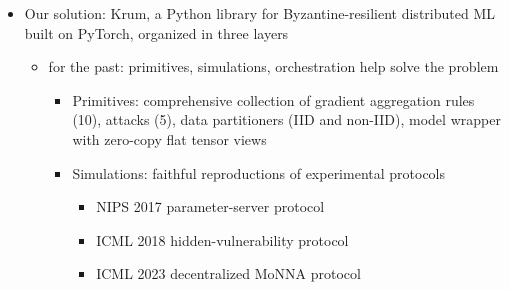 \documentclass[twoside,11pt]{article}
\begin{document}
{\begin{itemize}
\begin{itemize}
        \begin{itemize}
            \item Each paper makes distinct implementation choices
            \item These choices are rarely isolated in reusable components
        \end{itemize}
        \item Existing libraries address parts of the problem, but each has its own scope and design philosophy
        \begin{itemize}
            \item Some offer a collection of aggregation rules without attacks or simulation harnesses
            \item Others focus on a single protocol
            \item None, to our knowledge, provides a unified framework spanning aggregation rules, attacks, experimental protocols, and parameter-sweep orchestration
        \end{itemize}
        \item Support past and (most importantly) future research experiments
        \item Integrated to pytorch 
    \end{itemize}
    \item Our solution: Krum, a Python library for Byzantine-resilient distributed ML built on PyTorch, organized in three layers
    \begin{itemize}
        \item for the past: primitives, simulations, orchestration help solve the problem
        \begin{itemize}
            \item Primitives: comprehensive collection of gradient aggregation rules (10), attacks (5), data partitioners (IID and non-IID), model wrapper with zero-copy flat tensor views
            \item Simulations: faithful reproductions of experimental protocols
            \begin{itemize}
                \item NIPS 2017 parameter-server protocol
                \item ICML 2018 hidden-vulnerability protocol
                \item ICML 2023 decentralized MoNNA protocol
            \end{itemize}

\end{itemize}
\end{itemize}
\end{itemize}}
\end{document}
